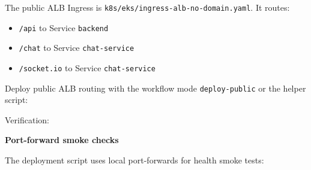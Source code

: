 The public ALB Ingress is \texttt{k8s/\allowbreak{}eks/\allowbreak{}ingress-\allowbreak{}alb-\allowbreak{}no-\allowbreak{}domain.\allowbreak{}yaml}.
It routes:

\begin{itemize}
\tightlist
\item
  \texttt{/\allowbreak{}api} to Service \texttt{backend}
\item
  \texttt{/\allowbreak{}chat} to Service \texttt{chat-\allowbreak{}service}
\item
  \texttt{/\allowbreak{}socket.\allowbreak{}io} to Service \texttt{chat-\allowbreak{}service}
\end{itemize}

Deploy public ALB routing with the workflow mode \texttt{deploy-\allowbreak{}public}
or the helper script:

\begin{Shaded}
\begin{Highlighting}[]
\OperatorTok{=}
\end{Highlighting}
\end{Shaded}

Verification:

\begin{Shaded}
\begin{Highlighting}[]
 
 
\end{Highlighting}
\end{Shaded}

\vspace{0.5em}\noindent\textbf{Port-forward smoke checks}\par

The deployment script uses local port-forwards for health smoke tests:

\begin{Shaded}
\begin{Highlighting}[]
 
\end{Highlighting}
\end{Shaded}

